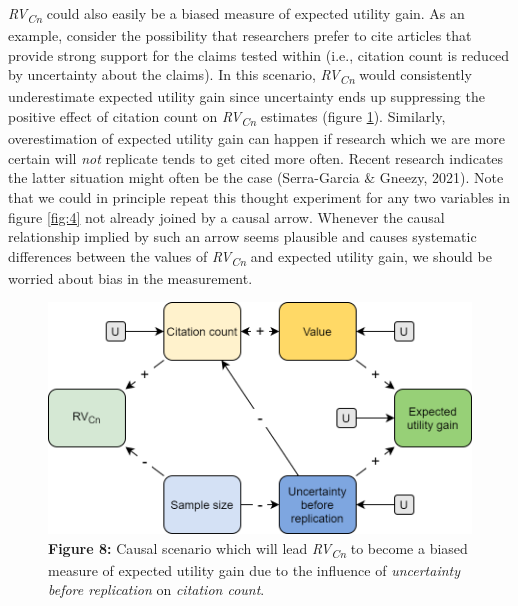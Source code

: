 \documentclass[
  english,
  man,floatsintext]{apa6}
\begin{document}
\emph{RV\textsubscript{Cn}} could also easily be a biased measure of expected utility gain. As an example, consider the possibility that researchers prefer to cite articles that provide strong support for the claims tested within (i.e., citation count is reduced by uncertainty about the claims). In this scenario, \emph{RV\textsubscript{Cn}} would consistently underestimate expected utility gain since uncertainty ends up suppressing the positive effect of citation count on \emph{RV\textsubscript{Cn}} estimates (figure \ref{fig:8}). Similarly, overestimation of expected utility gain can happen if research which we are more certain will \emph{not} replicate tends to get cited more often. Recent research indicates the latter situation might often be the case (Serra-Garcia \& Gneezy, 2021). Note that we could in principle repeat this thought experiment for any two variables in figure \ref{fig:4} not already joined by a causal arrow. Whenever the causal relationship implied by such an arrow seems plausible and causes systematic differences between the values of \emph{RV\textsubscript{Cn}} and expected utility gain, we should be worried about bias in the measurement.

\begin{figure}
\centering
\includegraphics{figure_8.png}
\caption{\textbf{Figure 8:} Causal scenario which will lead \emph{RV\textsubscript{Cn}} to become a biased measure of expected utility gain due to the influence of \emph{uncertainty before replication} on \emph{citation count}. \label{fig:8}}
\end{figure}
\end{document}
